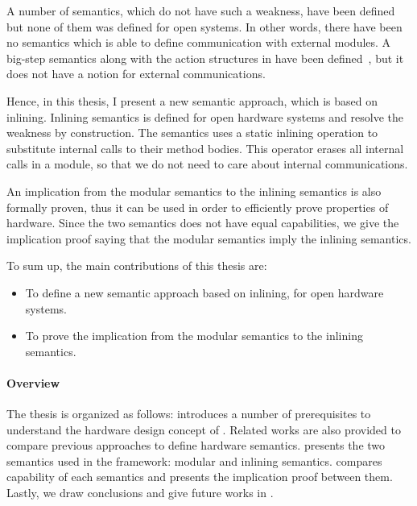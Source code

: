 A number of semantics, which do not have such a weakness, have been
defined but none of them was defined for open systems. In other words,
there have been no semantics which is able to define communication
with external modules. A big-step semantics along with the action
structures in \Bluespec{} have been defined~\cite{nirav-memocode}, but
it does not have a notion for external communications.

Hence, in this thesis, I present a new semantic approach, which is
based on inlining. Inlining semantics is defined for open hardware
systems and resolve the weakness by construction. The semantics uses a
static inlining operation to substitute internal calls to their method
bodies. This operator erases all internal calls in a module, so that
we do not need to care about internal communications.

An implication from the modular semantics to the inlining semantics is
also formally proven, thus it can be used in order to efficiently
prove properties of hardware. Since the two semantics does not have
equal capabilities, we give the implication proof saying that the
modular semantics imply the inlining semantics.

To sum up, the main contributions of this thesis are:
\begin{itemize}
\item To define a new semantic approach based on inlining, for open
  hardware systems.
\item To prove the implication from the modular semantics to the
  inlining semantics.
\end{itemize}

\paragraph{Overview}

The thesis is organized as follows: 
introduces a number of prerequisites to understand the hardware design
concept of \Bluespec{}. Related works are also provided to compare
previous approaches to define hardware semantics.
 presents the two semantics used in the
\Kami{} framework: modular and inlining
semantics.  compares capability of each
semantics and presents the implication proof between them. Lastly, we
draw conclusions and give future works in .

